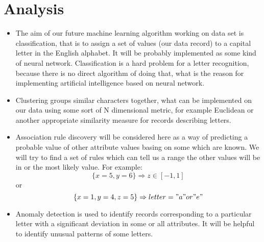 \section*{Analysis}
\begin{itemize}
\item The aim of our future machine learning algorithm working on data set is
classification, that is to assign a set of values (our data record) to a
capital letter in the English alphabet. It will be probably implemented as
some kind of neural network. Classification is a hard problem for a letter
recognition, because there is no direct algorithm of doing that, what is the
reason for implementing artificial intelligence based on neural network.
\item Clustering groups similar characters together, what can be implemented on
our data using some sort of N dimensional metric, for example Euclidean or
another appropriate similarity measure for records describing letters.
\item Association rule discovery will be considered here as a way of predicting
a probable value of other attribute values basing on some which are known.
We will try to find a set of rules which can tell us a range the other values
will be in or the most likely value. For example:
$$
\{ x = 5, y = 6 \} \Rightarrow z \in [-1,1]
$$
or
$$
\{ x = 1, y = 4, z = 5 \} \Rightarrow letter = "a" or "e"
$$
\item Anomaly detection is used to identify records corresponding to a particular
letter with a significant deviation in some or all attributes. It will be helpful
to identify unusual patterns of some letters.
\end{itemize}

